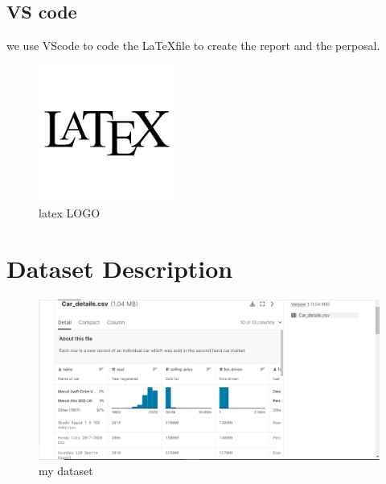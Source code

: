 \documentclass{article}
\begin{document}
\subsection{VS code}
we use VScode to code the \LaTeX file to create the report and the perposal.

\begin{figure}[h]
    \centering
    \includegraphics[width=0.4\textwidth]{latex.png}
    \caption{latex LOGO}
    \label{fig:my_label}
\end{figure}

\section{Dataset Description}

\begin{figure}[h]
    \centering
    \includegraphics[width=1\textwidth]{car-details.png}
    \caption{my dataset}
    \label{fig:my_label}
\end{figure}
\end{document}
